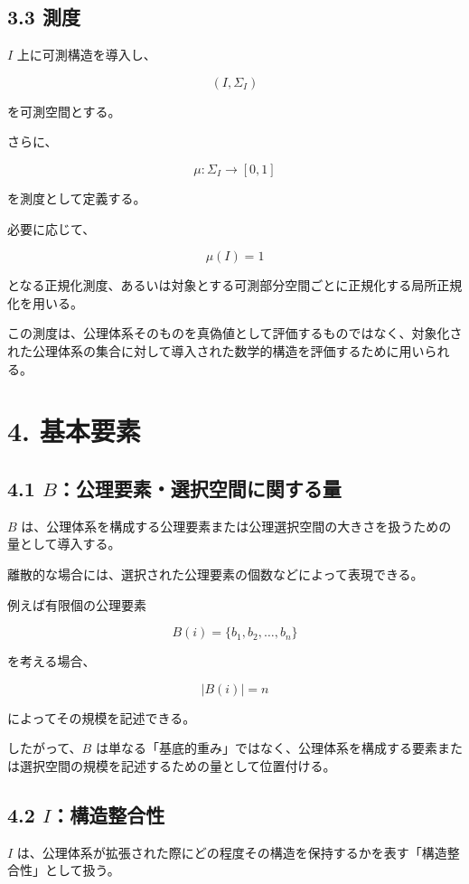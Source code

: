\documentclass[12pt,a4paper]{article}
\begin{document}
\subsection{3.3 測度}

$I$ 上に可測構造を導入し、

\[
(I,\Sigma_I)
\]

を可測空間とする。

さらに、

\[
\mu:\Sigma_I\rightarrow[0,1]
\]

を測度として定義する。

必要に応じて、

\[
\mu(I)=1
\]

となる正規化測度、あるいは対象とする可測部分空間ごとに正規化する局所正規化を用いる。

この測度は、公理体系そのものを真偽値として評価するものではなく、対象化された公理体系の集合に対して導入された数学的構造を評価するために用いられる。

\section{4. 基本要素}

\subsection{4.1 $B$：公理要素・選択空間に関する量}

$B$ は、公理体系を構成する公理要素または公理選択空間の大きさを扱うための量として導入する。

離散的な場合には、選択された公理要素の個数などによって表現できる。

例えば有限個の公理要素

\[
B(i)=\{b_1,b_2,\ldots,b_n\}
\]

を考える場合、

\[
|B(i)|=n
\]

によってその規模を記述できる。

したがって、$B$ は単なる「基底的重み」ではなく、公理体系を構成する要素または選択空間の規模を記述するための量として位置付ける。

\subsection{4.2 $I$：構造整合性}

$I$ は、公理体系が拡張された際にどの程度その構造を保持するかを表す「構造整合性」として扱う。
\end{document}
